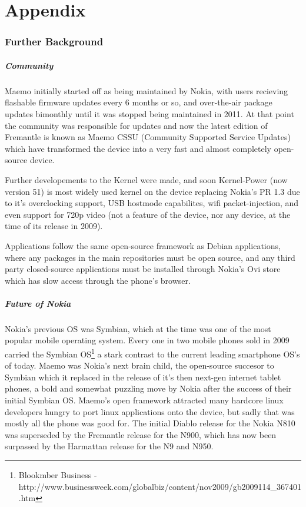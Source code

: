 \part{Appendix}
\section{Further Background}

\subsubsection{Community}\label{maemocomm}
Maemo initially started off as being maintained by Nokia, with users recieving flashable firmware updates every 6 months or so, and over-the-air package updates bimonthly until it was stopped being maintained in 2011. At that point the community was responsible for updates and now the latest edition of Fremantle is known as Maemo CSSU (Community Supported Service Updates) which have transformed the device into a very fast and almost completely open-source device.

Further developements to the Kernel were made, and soon Kernel-Power (now version 51)  is most widely used kernel on the device replacing Nokia's PR 1.3 due to it's overclocking support, USB hostmode capabilites, wifi packet-injection, and even support for 720p video (not a feature of the device, nor any device, at the time of its release in 2009).

Applications follow the same open-source framework as Debian applications, where any packages in the main repositories must be open source, and any third party closed-source applications must be installed through Nokia's Ovi store which has slow access through the phone's browser.


\subsubsection{Future of Nokia}
Nokia's previous OS was Symbian, which at the time was one of the most popular mobile operating system. Every one in two mobile phones sold in 2009 carried the Symbian OS\footnote{Blookmber Business - http://www.businessweek.com/globalbiz/content/nov2009/gb2009114\_367401.htm} a stark contrast to the current leading smartphone OS's of today. Maemo was Nokia's next brain child, the open-source succesor to Symbian which it replaced in the release of  it's then next-gen internet tablet phones, a bold and somewhat puzzling move by Nokia after the success of their initial Symbian OS. Maemo's open framework attracted many hardcore linux developers hungry to port linux applications onto the device, but sadly that was mostly all the phone was good for. The initial Diablo release for the Nokia N810 was superseded by  the Fremantle release for the N900, which has now been surpassed by the Harmattan release for the N9 and N950.


